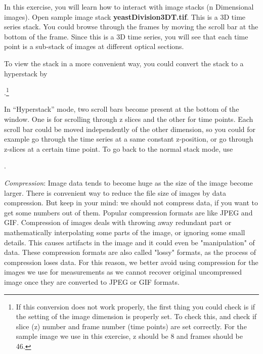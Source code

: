 \begin{indentexercise}{2}
  In this exercise, you will learn how to interact with image stacks (n
  Dimensional images).
  Open sample image stack \textbf{yeastDivision3DT.tif}.
  This is a 3D time series stack. You could browse through the frames by moving
  the scroll bar at the bottom of the frame.
  Since this is a 3D time series, you will see that each time point is a
  sub-stack of images at different optical sections. 
  
  To view the stack in a more
  convenient way, you could convert the stack to a hyperstack by 
  
  .\footnote{If this conversion does not work properly, the first thing you could
  check is if the setting of the image dimension is properly set.
  To check this,  and check if slice (z)
  number and frame number (time points) are set correctly.
  For the sample image we use in this exercise, z should be 8 and frames should
  be 46.}
  
   In ``Hyperstack'' mode, two scroll bars become present at the bottom of the
   window. One is for scrolling through z slices and the other for time points.
   Each scroll bar could be moved independently of the other dimension, so you
   could for example go through the time series at a same constant z-position,
   or go through z-slices at a certain time point.
   To go back to the normal stack mode, use 
   
   .
\end{indentexercise}


\textit{Compression}: Image data tends to become huge as the size of the image become larger. There is convenient way to reduce the file size of images by data compression. But keep in your mind:
we should not compress data, if you want to get some numbers out of them.
Popular compression formats are like JPEG and GIF. Compression of images deals
with throwing away redundant part or mathematically interpolating some parts of
the image, or ignoring some small details. This causes artifacts in the image and it could even be
"manipulation" of data. These compression formats are also called "lossy" formats, as
the process of compression loses data.  For this reason, we better avoid using compression for the images we use
for measurements as we cannot recover original uncompressed image once they are converted to JPEG or GIF formats. 

